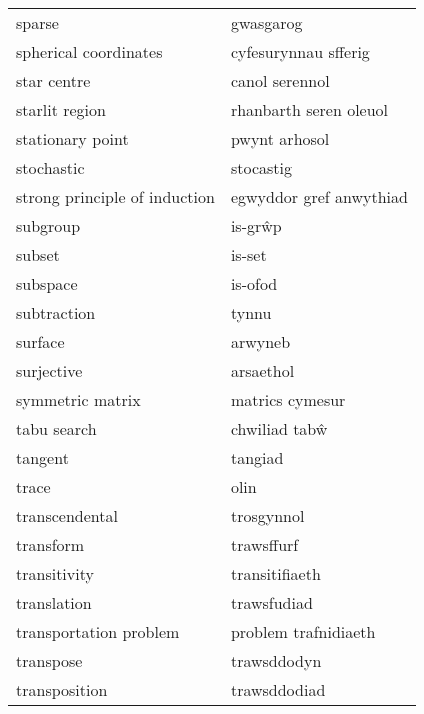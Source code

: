 \begin{supertabular}{p{0.22\textwidth}p{0.22\textwidth}}
                           sparse &                        gwasgarog \\
            spherical coordinates &             cyfesurynnau sfferig \\
                      star centre &                   canol serennol \\
                   starlit region &           rhanbarth seren oleuol \\
                 stationary point &                    pwynt arhosol \\
                       stochastic &                        stocastig \\
    strong principle of induction &          egwyddor gref anwythiad \\
                         subgroup &                          is-grŵp \\
                           subset &                           is-set \\
                         subspace &                          is-ofod \\
                      subtraction &                            tynnu \\
                          surface &                          arwyneb \\
                       surjective &                        arsaethol \\
                 symmetric matrix &                  matrics cymesur \\
                      tabu search &                    chwiliad tabŵ \\
                          tangent &                          tangiad \\
                            trace &                             olin \\
                   transcendental &                       trosgynnol \\
                        transform &                       trawsffurf \\
                     transitivity &                   transitifiaeth \\
                      translation &                      trawsfudiad \\
           transportation problem &             problem trafnidiaeth \\
                        transpose &                      trawsddodyn \\
                    transposition &                     trawsddodiad \\

\end{supertabular}
